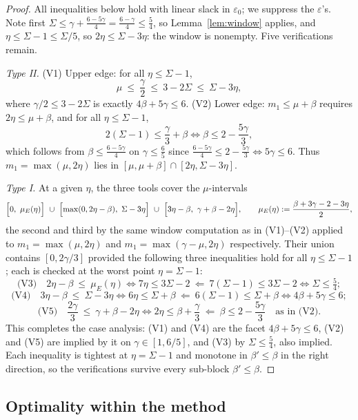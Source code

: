 \documentclass[11pt]{article}
\theoremstyle{remark}
\begin{document}
\begin{proof}
All inequalities below hold with linear slack in $\varepsilon_0$; we suppress the
$\varepsilon$'s. Note first $\Sigma\le\gamma+\frac{6-5\gamma}{4}=\frac{6-\gamma}{4}
\le\frac54$, so Lemma~\ref{lem:window} applies, and $\eta\le\Sigma-1\le\Sigma/5$,
so $2\eta\le\Sigma-3\eta$: the window is nonempty. Five verifications remain.

\smallskip
\emph{Type II.} (V1) Upper edge: for all $\eta\le\Sigma-1$,
\[
\mu\ \le\ \frac{\gamma}{2}\ \le\ 3-2\Sigma\ \le\ \Sigma-3\eta ,
\]
where $\gamma/2\le 3-2\Sigma$ is exactly $4\beta+5\gamma\le 6$. (V2) Lower edge:
$m_1\le\mu+\beta$ requires $2\eta\le\mu+\beta$, and for all $\eta\le\Sigma-1$,
\[
2(\Sigma-1)\le \frac{\gamma}{3}+\beta
\iff \beta\le 2-\frac{5\gamma}{3},
\]
which follows from $\beta\le\frac{6-5\gamma}{4}$ on $\gamma\le\frac65$ since
$\frac{6-5\gamma}{4}\le 2-\frac{5\gamma}{3}\iff 5\gamma\le 6$. Thus
$m_1=\max(\mu,2\eta)$ lies in $[\mu,\mu+\beta]\cap[2\eta,\Sigma-3\eta]$.

\smallskip
\emph{Type I.} At a given $\eta$, the three tools cover the $\mu$-intervals
\[
\Bigl[0,\ \mu_E(\eta)\Bigr]\ \cup\
\Bigl[\max(0,2\eta-\beta),\ \Sigma-3\eta\Bigr]\ \cup\
\Bigl[3\eta-\beta,\ \gamma+\beta-2\eta\Bigr],
\qquad \mu_E(\eta):=\frac{\beta+3\gamma-2-3\eta}{2},
\]
the second and third by the same window computation as in (V1)--(V2) applied to
$m_1=\max(\mu,2\eta)$ and $m_1=\max(\gamma-\mu,2\eta)$ respectively. Their union
contains $[0,2\gamma/3]$ provided the following three inequalities hold for all
$\eta\le \Sigma-1$; each is checked at the worst point $\eta=\Sigma-1$:
\[
\text{(V3)}\quad 2\eta-\beta\ \le\ \mu_E(\eta)
\iff 7\eta\le 3\Sigma-2
\ \Longleftarrow\ 7(\Sigma-1)\le 3\Sigma-2\iff \Sigma\le\tfrac54 ;
\]
\[
\text{(V4)}\quad 3\eta-\beta\ \le\ \Sigma-3\eta
\iff 6\eta\le\Sigma+\beta
\ \Longleftarrow\ 6(\Sigma-1)\le\Sigma+\beta\iff 4\beta+5\gamma\le 6 ;
\]
\[
\text{(V5)}\quad \frac{2\gamma}{3}\ \le\ \gamma+\beta-2\eta
\iff 2\eta\le\beta+\frac{\gamma}{3}
\ \Longleftarrow\ \beta\le 2-\frac{5\gamma}{3}\quad\text{as in (V2)} .
\]
This completes the case analysis: (V1) and (V4) are the facet $4\beta+5\gamma\le6$,
(V2) and (V5) are implied by it on $\gamma\in[1,6/5]$, and (V3) by
$\Sigma\le\frac54$, also implied. Each inequality is tightest at $\eta=\Sigma-1$ and
monotone in $\beta'\le\beta$ in the right direction, so the verifications survive
every sub-block $\beta'\le\beta$.
\end{proof}

\subsection{Optimality within the method}\label{sec:optimal}
\end{document}

